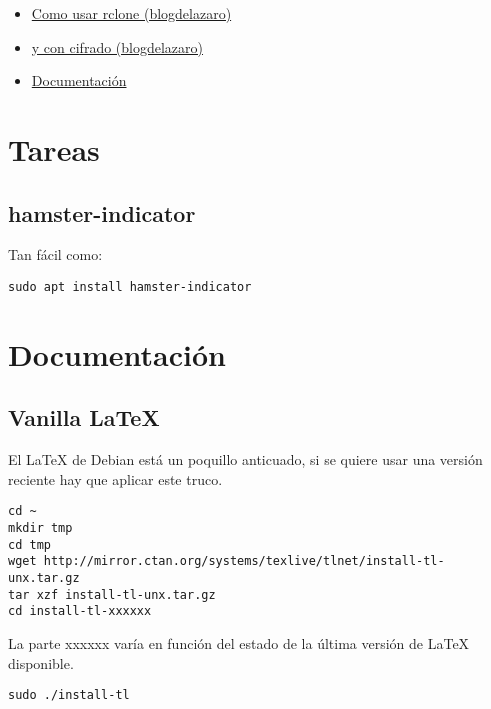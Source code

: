 \documentclass[
  12pt,
  spanish,
]{article}
\providecommand{\tightlist}{%
  \setlength{\itemsep}{0pt}\setlength{\parskip}{0pt}}
\begin{document}
\begin{itemize}
\tightlist
\item
  \href{https://elblogdelazaro.gitlab.io//articles/rclone-sincroniza-ficheros-en-la-nube/}{Como
  usar rclone (blogdelazaro)}
\item
  \href{https://elblogdelazaro.gitlab.io//articles/rclone-cifrado-de-ficheros-en-la-nube/}{y
  con cifrado (blogdelazaro)}
\item
  \href{https://rclone.org/docs/}{Documentación}
\end{itemize}

\hypertarget{tareas}{%
\section{Tareas}\label{tareas}}

\hypertarget{hamster-indicator}{%
\subsection{hamster-indicator}\label{hamster-indicator}}

Tan fácil como:

\begin{verbatim}
sudo apt install hamster-indicator
\end{verbatim}

\hypertarget{documentaciuxf3n}{%
\section{Documentación}\label{documentaciuxf3n}}

\hypertarget{vanilla-latex}{%
\subsection{Vanilla LaTeX}\label{vanilla-latex}}

El LaTeX de Debian está un poquillo anticuado, si se quiere usar una
versión reciente hay que aplicar este truco.

\begin{verbatim}
cd ~
mkdir tmp
cd tmp
wget http://mirror.ctan.org/systems/texlive/tlnet/install-tl-unx.tar.gz
tar xzf install-tl-unx.tar.gz
cd install-tl-xxxxxx
\end{verbatim}

La parte xxxxxx varía en función del estado de la última versión de
LaTeX disponible.

\begin{verbatim}
sudo ./install-tl
\end{verbatim}
\end{document}
